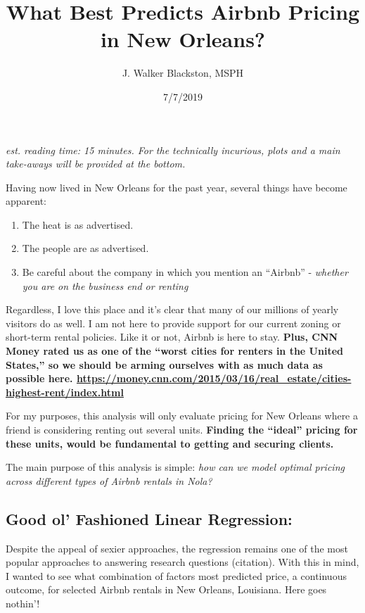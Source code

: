 \documentclass[]{article}
\title{What Best Predicts Airbnb Pricing in New Orleans?}
\author{J. Walker Blackston, MSPH}
\date{7/7/2019}
\providecommand{\tightlist}{%
  \setlength{\itemsep}{0pt}\setlength{\parskip}{0pt}}
\begin{document}
\maketitle

\emph{est. reading time: 15 minutes. For the technically incurious,
plots and a main take-aways will be provided at the bottom.}

Having now lived in New Orleans for the past year, several things have
become apparent:

\begin{enumerate}
\def\labelenumi{\arabic{enumi})}
\tightlist
\item
  The heat is as advertised.
\item
  The people are as advertised.
\item
  Be careful about the company in which you mention an ``Airbnb'' -
  \emph{whether you are on the business end or renting}
\end{enumerate}

Regardless, I love this place and it's clear that many of our millions
of yearly visitors do as well. I am not here to provide support for our
current zoning or short-term rental policies. Like it or not, Airbnb is
here to stay. \textbf{Plus, CNN Money rated us as one of the ``worst
cities for renters in the United States,'' so we should be arming
ourselves with as much data as possible here.
\url{https://money.cnn.com/2015/03/16/real_estate/cities-highest-rent/index.html}}

For my purposes, this analysis will only evaluate pricing for New
Orleans where a friend is considering renting out several units.
\textbf{Finding the ``ideal'' pricing for these units, would be
fundamental to getting and securing clients.}

The main purpose of this analysis is simple: \emph{how can we model
optimal pricing across different types of Airbnb rentals in Nola?}

\hypertarget{good-ol-fashioned-linear-regression}{%
\subsection{Good ol' Fashioned Linear
Regression:}\label{good-ol-fashioned-linear-regression}}

Despite the appeal of sexier approaches, the regression remains one of
the most popular approaches to answering research questions (citation).
With this in mind, I wanted to see what combination of factors most
predicted price, a continuous outcome, for selected Airbnb rentals in
New Orleans, Louisiana. Here goes nothin'!
\end{document}

